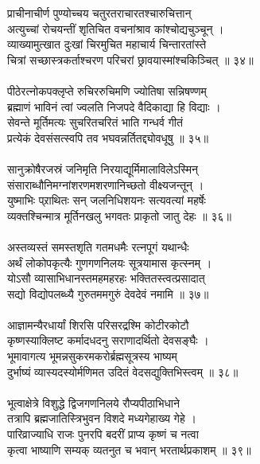 प्राचीनाचीर्ण पुण्योच्चय चतुरतराचारतश्चारुचित्तान्\\
     अत्युच्चां रोचयन्तीं श‍ृतिचित वचनांश्राव कांश्चोद्यचुञ्चून् ।\\
व्याख्यामुत्खात दुःखां चिरमुचित महाचार्य चिन्तारतांस्ते\\
     चित्रां सच्छास्त्रकर्ताश्चरण परिचरां छ्रावयास्मांश्चकिञ्चित् ॥ ३४॥\\
\\
पीठेरत्नोकपक्लृप्ते रुचिररुचिमणि ज्योतिषा सन्निषण्णम्\\
     ब्रह्माणं भाविनं त्वां ज्वलति निजपदे वैदिकाद्या हि विद्याः ।\\
सेवन्ते मूर्तिमत्यः सुचरितचरितं भाति गन्धर्व गीतं\\
     प्रत्येकं देवसंसत्स्वपि तव भघवन्नर्तितद्द्योवधूषु ॥ ३५॥\\
\\
सानुक्रोषैरजस्रं जनिमृति निरयाद्यूर्मिमालाविलेऽस्मिन्\\
     संसाराब्धौनिमग्नांशरणमशरणानिच्छतो वीक्ष्यजन्तून् ।\\
युष्माभिः प्र्राथितः सन् जलनिधिशयनः सत्यवत्यां महर्षेः\\
     व्यक्तश्चिन्मात्र मूर्तिनखलु भगवतः प्राकृतो जातु देहः ॥ ३६॥\\
\\
अस्तव्यस्तं समस्तश‍ृति गतमधमैः रत्नपूगं यथान्धैः\\
     अर्थं लोकोपकृत्यैः गुणगणनिलयः सूत्रयामास कृत्स्नम् ।\\
योऽसौ व्यासाभिधानस्तमहमहरहः भक्तितस्त्वत्प्रसादात्\\
     सद्यो विद्योपलब्ध्यै गुरुतममगुरुं देवदेवं नमामि ॥ ३७॥\\
\\
आज्ञामन्यैरधार्यां शिरसि परिसरद्रश्मि कोटीरकोटौ\\
     कृष्णस्याक्लिष्ट कर्मादधदनु सराणादर्थितो देवसङ्घैः ।\\
भूमावागत्य भूमन्नसुकरमकरोर्ब्रह्मसूत्रस्य भाष्यम्\\
     दुर्भाष्यं व्यास्यदस्योर्मणिमत उदितं वेदसद्युक्तिभिस्त्वम् ॥ ३८॥\\
\\
भूत्वाक्षेत्रे विशुद्धे द्विजगणनिलये रौप्यपीठाभिधाने\\
     तत्रापि ब्रह्मजातिस्त्रिभुवन  विशदे मध्यगेहाख्य गेहे ।\\
पारिव्राज्याधि राजः पुनरपि बदरीं प्राप्य कृष्णं च नत्वा\\
     कृत्वा भाष्याणि सम्यक् व्यतनुत च भवान् भरतार्थप्रकाशम् ॥ ३९॥\\
